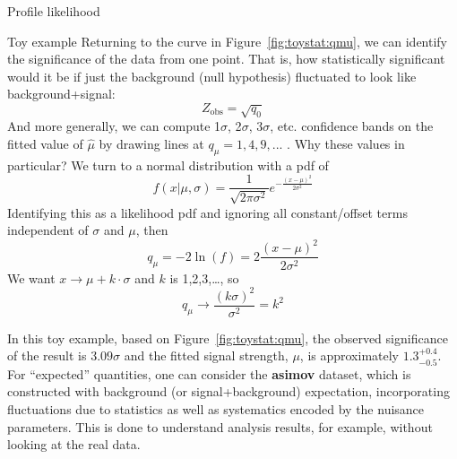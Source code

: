 \begin{section}{Profile likelihood}
\begin{subsection}{Toy example}
Returning to the curve in Figure~\ref{fig:toystat:qmu}, we can identify the significance of the data from
one point. That is, how statistically significant would it be if just
the background (null hypothesis) fluctuated to look like background+signal: 
\begin{equation}
Z_\text{obs} = \sqrt{q_0}
\end{equation}
 And more generally, we can compute 1$\sigma$, 2$\sigma$,
3$\sigma$, etc. confidence bands on the fitted value of $\hat\mu$ by
drawing lines at $q_\mu=1,4,9,...$ . Why these values in particular? We turn to a
normal distribution with a pdf of
\begin{equation}
f(x|\mu,\sigma)=\frac{1}{\sqrt{2\pi\sigma^2}}e^{-\frac{(x-\mu)^2}{2\sigma^2}}
\end{equation}
Identifying this as a likelihood pdf and ignoring all constant/offset
terms independent of $\sigma$ and $\mu$, then 
\begin{equation}
q_\mu = -2\ln(f) = 2\frac{(x-\mu)^2}{2\sigma^2}
\end{equation}
 We want $x\rightarrow \mu+k\cdot\sigma$ and $k$ is
1,2,3,\ldots{}, so 
\begin{equation}
q_\mu \rightarrow \frac{(k\sigma)^2}{\sigma^2}=k^2
\end{equation}

In this toy example, based on Figure~\ref{fig:toystat:qmu}, the observed significance of the result is $3.09\sigma$
and the fitted signal strength, $\mu$, is approximately $1.3^{+0.4}_{-0.5}$.
For ``expected'' quantities, one can consider the \textbf{asimov} dataset, which is constructed
with background (or signal+background) expectation, incorporating fluctuations due to statistics as well
as systematics encoded by the nuisance parameters. This is done to understand analysis results, for example,
without looking at the real data.

\end{subsection}

\end{section}
